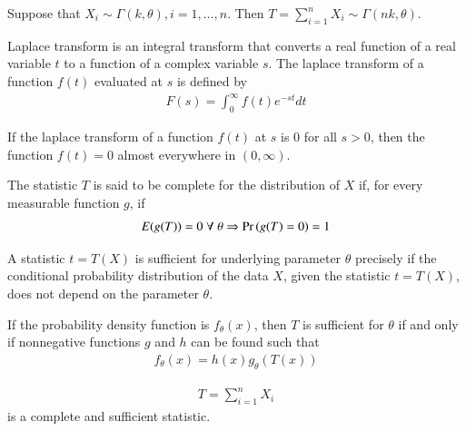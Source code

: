 \begin{lemma}
    \label{stats/4/gamma}
Suppose that $X_i \sim \Gamma(k, \theta), i = 1, \dots, n$. Then $T = \sum_{i=1}^{n} X_i \sim \Gamma(nk, \theta)$.
\end{lemma}
\begin{definition}
    Laplace transform is an integral transform that converts a real function of a real variable $t$ to a function of a complex variable $s$. The laplace transform of a function $f(t)$ evaluated at $s$ is defined by
    \begin{align}
    F(s) = \int_0^{\infty} f(t) e^{-st} dt
    \end{align}
    \end{definition}
    \begin{lemma}
    \label{stats/6/lemma_laplace_transform}
    If the laplace transform of a function $f(t)$ at $s$ is $0$ for all $s>0$, then the function $f(t) = 0$ almost everywhere in $(0, \infty)$.
    \end{lemma}
\begin{definition}
The statistic $T$ is said to be complete for the distribution of $X$ if, for every measurable function $g$, if
\begin{align}
E(g(T)) = 0 \; \forall \; \theta \Rightarrow \Pr\left(g(T)=0\right) = 1 
\end{align}
\end{definition}
\begin{definition}
A statistic $t = T(X)$ is sufficient for underlying parameter $\theta$ precisely if the conditional probability distribution of the data $X$, given the statistic $t = T(X)$, does not depend on the parameter $\theta$. 
\end{definition}
\begin{theorem}
If the probability density function is $f_\theta (x)$, then $T$ is sufficient for $\theta$ if and only if nonnegative functions $g$ and $h$ can be found such that
\begin{align}
f_\theta (x) = h(x)g_\theta(T(x))
\end{align}
\end{theorem}
\begin{lemma} \label{stats/6/lemma_sufficient_complete}
\begin{align}
T = \sum_{i=1}^{n} X_i
\end{align}
is a complete and sufficient statistic. 
\end{lemma}
